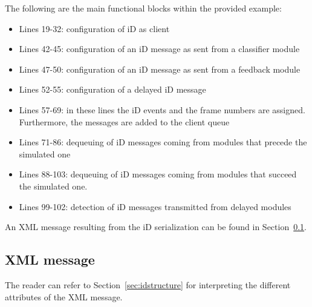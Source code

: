 \documentclass[a4paper,10pt]{article}
\begin{document}
The following are the main functional blocks within the provided example:
\begin{itemize}
  \item Lines 19-32: configuration of iD as client
  \item Lines 42-45: configuration of an iD message as sent from a classifier
  module
  \item Lines 47-50: configuration of an iD message as sent from a feedback
  module
  \item Lines 52-55: configuration of a delayed iD message
  \item Lines 57-69: in these lines the iD events and the frame numbers are
  assigned. Furthermore, the messages are added to the client queue
  \item Lines 71-86: dequeuing of iD messages coming from modules that precede
  the simulated one
  \item Lines 88-103: dequeuing of iD messages coming from modules that succeed
  the simulated one.
  \item Lines 99-102: detection of iD messages transmitted from delayed modules
\end{itemize}
An XML message resulting from the iD serialization can be found in
Section~\ref{sec:code:xml}.


\subsection{XML message}
\label{sec:code:xml}
The reader can refer to Section~\ref{sec:idstructure} for interpreting the
different attributes of the XML message.

\end{document}
